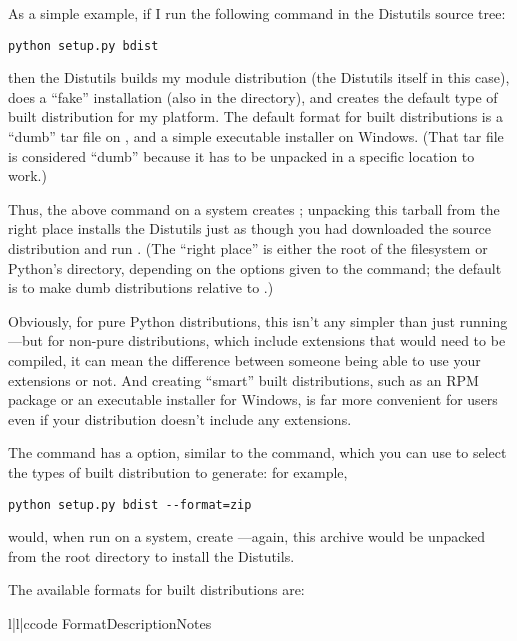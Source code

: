 \documentclass{manual}
\begin{document}
As a simple example, if I run the following command in the Distutils
source tree:

\begin{verbatim}
python setup.py bdist
\end{verbatim}

then the Distutils builds my module distribution (the Distutils itself
in this case), does a ``fake'' installation (also in the 
directory), and creates the default type of built distribution for my
platform.  The default format for built distributions is a ``dumb'' tar
file on \UNIX, and a simple executable installer on Windows.  (That tar
file is considered ``dumb'' because it has to be unpacked in a specific
location to work.)

Thus, the above command on a \UNIX{} system creates
; unpacking this tarball
from the right place installs the Distutils just as though you had
downloaded the source distribution and run .  (The ``right place'' is either the root of the filesystem or 
Python's  directory, depending on the options given to
the  command; the default is to make dumb
distributions relative to .)  

Obviously, for pure Python distributions, this isn't any simpler than
just running ---but for non-pure
distributions, which include extensions that would need to be
compiled, it can mean the difference between someone being able to use
your extensions or not.  And creating ``smart'' built distributions,
such as an RPM package or an executable installer for Windows, is far
more convenient for users even if your distribution doesn't include
any extensions.

The  command has a  option,
similar to the  command, which you can use to select the
types of built distribution to generate: for example,

\begin{verbatim}
python setup.py bdist --format=zip
\end{verbatim}

would, when run on a \UNIX{} system, create
---again, this archive would be
unpacked from the root directory to install the Distutils.

The available formats for built distributions are:

\begin{tableiii}{l|l|c}{code}%
  {Format}{Description}{Notes}
\end{tableiii}
\end{document}
